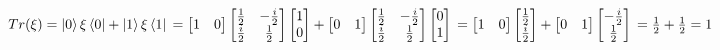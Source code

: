 \documentclass{article}
\begin{document}
\begin{enumerate}
          $Tr(\xi) = \ket{0}\xi\bra{0}+\ket{1}\xi\bra{1}
              \\= \begin{bmatrix}
                  1 & 0
              \end{bmatrix}\begin{bmatrix}
                  \frac{1}{2} & -\frac{i}{2} \\
                  \frac{i}{2} & \frac{1}{2}
              \end{bmatrix}\begin{bmatrix}
                  1 \\
                  0
              \end{bmatrix}+\begin{bmatrix}
                  0 & 1
              \end{bmatrix}\begin{bmatrix}
                  \frac{1}{2} & -\frac{i}{2} \\
                  \frac{i}{2} & \frac{1}{2}
              \end{bmatrix}\begin{bmatrix}
                  0 \\
                  1
              \end{bmatrix}
              \\= \begin{bmatrix}
                  1 & 0
              \end{bmatrix}\begin{bmatrix}
                  \frac{1}{2} \\
                  \frac{i}{2}
              \end{bmatrix}+\begin{bmatrix}
                  0 & 1
              \end{bmatrix}\begin{bmatrix}
                  -\frac{i}{2} \\
                  \frac{1}{2}
              \end{bmatrix}
              \\= \frac{1}{2}+\frac{1}{2}
              \\= 1$


\end{enumerate}
\end{document}
